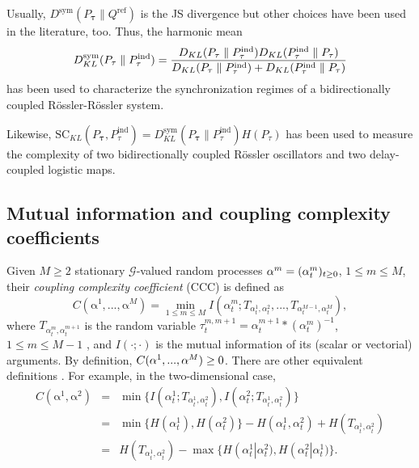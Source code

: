 \documentclass[%
 aip,
 amsmath,amssymb,
 reprint,%
]{revtex4-1}
\begin{document}
Usually, $D^{\mathrm{sym}}(P_{\mathbf{\tau }}\parallel Q^{\mathrm{ref}})$ is
the JS divergence but other choices have been used in the literature, too.
Thus, the harmonic mean%
\begin{equation*}
D_{KL}^{\mathrm{sym}}(P_{\mathbf{\tau }}\parallel P_{\tau }^{\mathrm{ind}})=%
\frac{D_{KL}(P_{\mathbf{\tau }}\parallel P_{\tau }^{\mathrm{ind}%
})D_{KL}(P_{\tau }^{\mathrm{ind}}\parallel P_{\mathbf{\tau }})}{D_{KL}(P_{%
\mathbf{\tau }}\parallel P_{\tau }^{\mathrm{ind}})+D_{KL}(P_{\tau }^{\mathrm{%
ind}}\parallel P_{\mathbf{\tau }})}
\end{equation*}%
has been used \cite{Monetti2009} to characterize the synchronization regimes
of a bidirectionally coupled R\"{o}ssler-R\"{o}ssler system.

Likewise, $\mathrm{SC}_{KL}(P_{\mathbf{\tau }},P_{\tau }^{\mathrm{ind}%
})=D_{KL}^{\mathrm{sym}}(P_{\mathbf{\tau }}\parallel P_{\tau }^{\mathrm{ind}%
})H(P_{\tau })$ has been used \cite{Amigo2012} to measure the complexity of
two bidirectionally coupled R\"{o}ssler oscillators and two delay-coupled
logistic maps.



\subsection{Mutual information and coupling complexity coefficients}

\label{sec54}

Given $M\geq 2$ stationary $\mathcal{G}$-valued random processes $\mathrm{%
\alpha }^{m}=(\alpha _{t}^{m})_{t\geq 0}$, $1\leq m\leq M$, their \textit{coupling
complexity coefficient} (CCC) is defined as \cite{Monetti2013,Monetti2013B}%
\begin{equation}
C(\mathrm{\alpha }^{1},...,\mathrm{\alpha }^{M})=\min_{1\leq m\leq
M}I(\alpha _{t}^{m};T_{\alpha _{t}^{1},\alpha _{t}^{2}},...,T_{\alpha
_{t}^{M-1},\alpha _{t}^{M}}),  \label{CCC}
\end{equation}%
where $T_{\alpha _{t}^{m},\alpha _{t}^{m+1}}$ is the random variable $\tau
_{t}^{m,m+1}=\alpha _{t}^{m+1}\ast (\alpha _{t}^{m})^{-1}$, $1\leq m\leq M-1$%
, and $I(\cdot ;\cdot )$ is the mutual information of its (scalar or
vectorial) arguments. By definition, $C(\mathrm{\alpha }^{1},...,\mathrm{%
\alpha }^{M})\geq 0$. There are other equivalent definitions \cite%
{Monetti2013,Monetti2013B}. For example, in the two-dimensional case,%
\begin{eqnarray*}
C(\mathrm{\alpha }^{1},\mathrm{\alpha }^{2}) &=&\min \{I(\alpha
_{t}^{1};T_{\alpha _{t}^{1},\alpha _{t}^{2}}),I(\alpha _{t}^{2};T_{\alpha
_{t}^{1},\alpha _{t}^{2}})\} \\
&=&\min \{H(\alpha _{t}^{1}),H(\alpha _{t}^{2})\}-H(\alpha _{t}^{1},\alpha
_{t}^{2})+H(T_{\alpha _{t}^{1},\alpha _{t}^{2}}) \\
&=&H(T_{\alpha _{t}^{1},\alpha _{t}^{2}})-\max \{H\left( \alpha
_{t}^{1}\right\vert \alpha _{t}^{2}),H\left( \alpha _{t}^{2}\right\vert
\alpha _{t}^{1})\}.
\end{eqnarray*}
\end{document}
